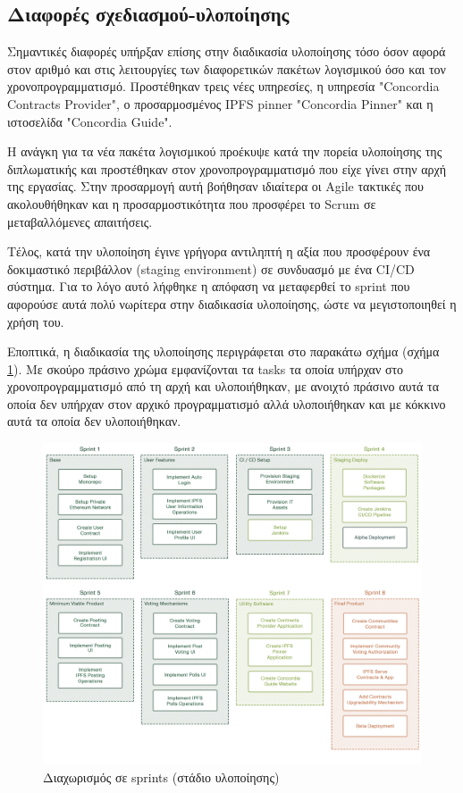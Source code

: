 \subsection{Διαφορές σχεδιασμού-υλοποίησης} \label{subsection:4-5-1-design-implementation-differences}

Σημαντικές διαφορές υπήρξαν επίσης στην διαδικασία υλοποίησης τόσο όσον αφορά στον αριθμό και στις λειτουργίες των διαφορετικών πακέτων λογισμικού όσο και τον χρονοπρογραμματισμό. Προστέθηκαν τρεις νέες υπηρεσίες, η υπηρεσία "Concordia Contracts Provider", ο προσαρμοσμένος IPFS pinner "Concordia Pinner" και η ιστοσελίδα "Concordia Guide".

Η ανάγκη για τα νέα πακέτα λογισμικού προέκυψε κατά την πορεία υλοποίησης της διπλωματικής και προστέθηκαν στον χρονοπρογραμματισμό που είχε γίνει στην αρχή της εργασίας. Στην προσαρμογή αυτή βοήθησαν ιδιαίτερα οι Agile τακτικές που ακολουθήθηκαν και η προσαρμοστικότητα που προσφέρει το Scrum σε μεταβαλλόμενες απαιτήσεις.

Τέλος, κατά την υλοποίηση έγινε γρήγορα αντιληπτή η αξία που προσφέρουν ένα δοκιμαστικό περιβάλλον (staging environment) σε συνδυασμό με ένα CI/CD σύστημα. Για το λόγο αυτό λήφθηκε η απόφαση να μεταφερθεί το sprint που αφορούσε αυτά πολύ νωρίτερα στην διαδικασία υλοποίησης, ώστε να μεγιστοποιηθεί η χρήση του.

Εποπτικά, η διαδικασία της υλοποίησης περιγράφεται στο παρακάτω σχήμα (σχήμα \ref{figure:4.5.design-implementation-differences-sprints}). Με σκούρο πράσινο χρώμα εμφανίζονται τα tasks τα οποία υπήρχαν στο χρονοπρογραμματισμό από τη αρχή και υλοποιήθηκαν, με ανοιχτό πράσινο αυτά τα οποία δεν υπήρχαν στον αρχικό προγραμματισμό αλλά υλοποιήθηκαν και με κόκκινο αυτά τα οποία δεν υλοποιήθηκαν.

\begin{figure}[H]
    \centering
    \includegraphics[width=\textwidth]{assets/figures/chapter-4/4.6.design-implementation-differences-sprints.png}
    \caption{Διαχωρισμός σε sprints (στάδιο υλοποίησης)}
    \label{figure:4.5.design-implementation-differences-sprints}
\end{figure}
